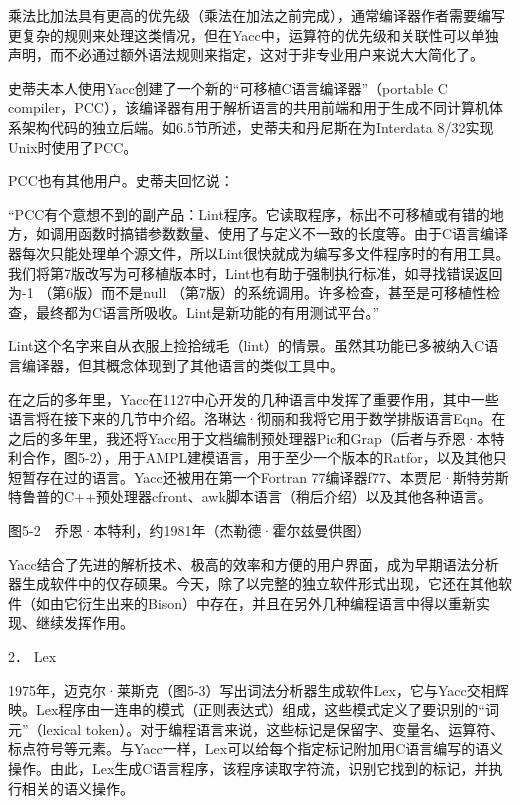 \documentclass[a4paper,12pt,UTF8,twoside]{ctexbook}
\begin{document}
{{乘法比加法具有更高的优先级（乘法在加法之前完成），通常编译器作者需要编写更复杂的规则来处理这类情况，但在Yacc中，运算符的优先级和关联性可以单独声明，而不必通过额外语法规则来指定，这对于非专业用户来说大大简化了。

史蒂夫本人使用Yacc创建了一个新的“可移植C语言编译器”（portable C compiler，PCC），该编译器有用于解析语言的共用前端和用于生成不同计算机体系架构代码的独立后端。如6.5节所述，史蒂夫和丹尼斯在为Interdata 8/32实现Unix时使用了PCC。

PCC也有其他用户。史蒂夫回忆说：

“PCC有个意想不到的副产品：Lint程序。它读取程序，标出不可移植或有错的地方，如调用函数时搞错参数数量、使用了与定义不一致的长度等。由于C语言编译器每次只能处理单个源文件，所以Lint很快就成为编写多文件程序时的有用工具。我们将第7版改写为可移植版本时，Lint也有助于强制执行标准，如寻找错误返回为-1 （第6版）而不是null （第7版）的系统调用。许多检查，甚至是可移植性检查，最终都为C语言所吸收。Lint是新功能的有用测试平台。”



Lint这个名字来自从衣服上捡拾绒毛（lint）的情景。虽然其功能已多被纳入C语言编译器，但其概念体现到了其他语言的类似工具中。

在之后的多年里，Yacc在1127中心开发的几种语言中发挥了重要作用，其中一些语言将在接下来的几节中介绍。洛琳达·彻丽和我将它用于数学排版语言Eqn。在之后的多年里，我还将Yacc用于文档编制预处理器Pic和Grap（后者与乔恩·本特利合作，图5-2），用于AMPL建模语言，用于至少一个版本的Ratfor，以及其他只短暂存在过的语言。Yacc还被用在第一个Fortran 77编译器f77、本贾尼·斯特劳斯特鲁普的C++预处理器cfront、awk脚本语言（稍后介绍）以及其他各种语言。



图5-2　乔恩·本特利，约1981年（杰勒德·霍尔兹曼供图）

Yacc结合了先进的解析技术、极高的效率和方便的用户界面，成为早期语法分析器生成软件中的仅存硕果。今天，除了以完整的独立软件形式出现，它还在其他软件（如由它衍生出来的Bison）中存在，并且在另外几种编程语言中得以重新实现、继续发挥作用。





2． Lex


1975年，迈克尔·莱斯克（图5-3）写出词法分析器生成软件Lex，它与Yacc交相辉映。Lex程序由一连串的模式（正则表达式）组成，这些模式定义了要识别的“词元”（lexical token）。对于编程语言来说，这些标记是保留字、变量名、运算符、标点符号等元素。与Yacc一样，Lex可以给每个指定标记附加用C语言编写的语义操作。由此，Lex生成C语言程序，该程序读取字符流，识别它找到的标记，并执行相关的语义操作。



}}
\end{document}
